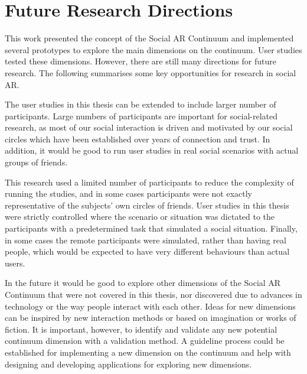 

\section{Future Research Directions}

This work presented the concept of the Social AR Continuum and implemented several prototypes to explore the main dimensions on the continuum. User studies tested these dimensions. However, there are still many directions for future research. The following summarises some key opportunities for research in social AR.

The user studies in this thesis can be extended to include larger number of participants. Large numbers of participants are important for social-related research, as most of our social interaction is driven and motivated by our social circles which have been established over years of connection and trust.  In addition, it would be good to run user studies in real social scenarios with actual groups of friends.

This research used a limited number of participants to reduce the complexity of running the studies, and in some cases participants were not exactly representative of the subjects' own circles of friends. User studies in this thesis were strictly controlled where the scenario or situation was dictated to the participants with a predetermined task that simulated a social situation. Finally, in some cases the remote participants were simulated, rather than having real people, which would be expected to have very different behaviours than actual users.

In the future it would be good to explore other dimensions of the Social AR Continuum that were not covered in this thesis, nor discovered due to advances in technology or the way people interact with each other. Ideas for new dimensions can be inspired by new interaction methods or based on imagination or works of fiction. It is important, however, to identify and validate any new potential continuum dimension with a validation method. A guideline process could be established for implementing a new dimension on the continuum and help with designing and developing applications for exploring new dimensions. 

